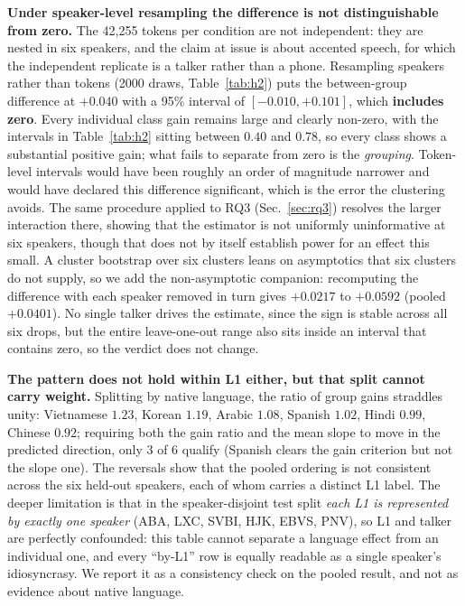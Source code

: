 \documentclass[journal]{IEEEtran}
\begin{document}
\textbf{Under speaker-level resampling the difference is not distinguishable
from zero.} The 42{,}255 tokens per condition are not independent: they are
nested in six speakers, and the claim at issue is about accented speech, for
which the independent replicate is a talker rather than a phone. Resampling
speakers rather than tokens (2000 draws, Table~\ref{tab:h2}) puts the
between-group difference at $+0.040$ with a 95\% interval of
$[-0.010, +0.101]$, which \textbf{includes zero}. Every individual class gain
remains large and clearly non-zero, with the intervals in Table~\ref{tab:h2}
sitting between $0.40$ and $0.78$, so every class shows a substantial positive
gain;
what fails to separate from zero is the \emph{grouping}. Token-level intervals
would have been roughly an order of magnitude narrower and would have declared
this difference significant, which is the error the clustering avoids. The same
procedure applied to RQ3 (Sec.~\ref{sec:rq3}) resolves the larger interaction
there, showing that the estimator is not uniformly uninformative at six
speakers, though that does not by itself establish power for an effect this
small.
A cluster bootstrap over six clusters leans on asymptotics that six clusters do
not supply, so we add the non-asymptotic companion: recomputing the difference
with each speaker removed in turn gives $+0.0217$ to $+0.0592$ (pooled
$+0.0401$). No single talker drives the estimate, since the sign is stable
across all six drops, but the entire leave-one-out range also sits inside an
interval that contains zero, so the verdict does not change.

\textbf{The pattern does not hold within L1 either, but that split cannot carry
weight.} Splitting by native language, the ratio of group gains straddles
unity: Vietnamese $1.23$, Korean $1.19$, Arabic $1.08$, Spanish $1.02$,
Hindi $0.99$, Chinese $0.92$; requiring both the gain ratio and the mean slope
to move in the predicted direction, only 3 of 6 qualify (Spanish clears the
gain criterion but not the slope one). The reversals show that the pooled
ordering is not consistent across the six held-out speakers, each of whom
carries a distinct L1 label.
The deeper limitation is that in the speaker-disjoint test split \emph{each L1
is represented by exactly one speaker} (ABA, LXC, SVBI, HJK, EBVS, PNV), so L1
and talker are perfectly confounded: this table cannot separate a language
effect from an individual one, and every ``by-L1'' row is equally readable as a
single speaker's idiosyncrasy. We report it as a consistency check on the
pooled result, and not as evidence about native language.
\end{document}
